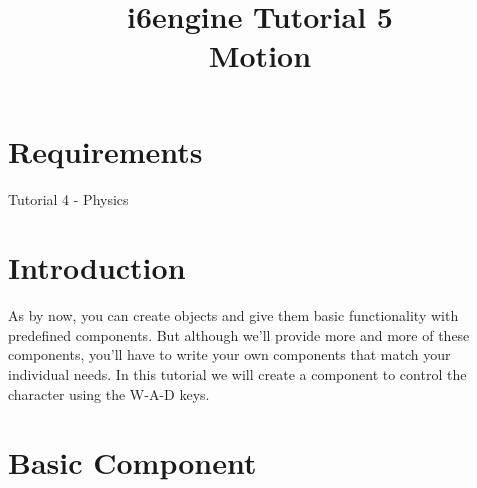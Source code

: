 \documentclass{article}
\title{i6engine Tutorial 5 \\ Motion}
\begin{document}
\section{Requirements}

Tutorial 4 - Physics

\section{Introduction}

As by now, you can create objects and give them basic functionality with predefined components. But although we'll provide more and more of these components, you'll have to write your own components that match your individual needs. In this tutorial we will create a component to control the character using the W-A-D keys.

\section{Basic Component}
\end{document}
